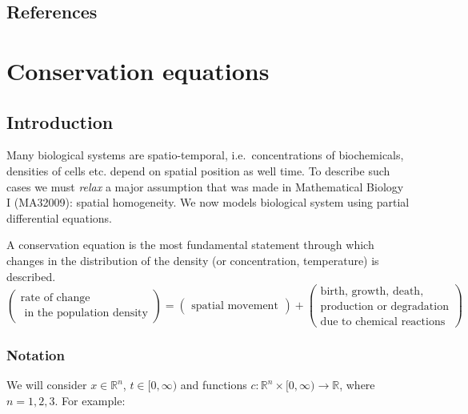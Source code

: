 \documentclass[
  letterpaper,
  DIV=11,
  numbers=noendperiod]{scrreprt}
\theoremstyle{plain}
\theoremstyle{definition}
\theoremstyle{plain}
\theoremstyle{remark}
\begin{document}
\hypertarget{references}{%
\section*{References}\label{references}}



\hypertarget{conservation-equations}{%
\chapter{Conservation equations}\label{conservation-equations}}

\hypertarget{sec-conservation}{%
\section{Introduction}\label{sec-conservation}}

Many biological systems are spatio-temporal, i.e.~concentrations of
biochemicals, densities of cells etc. depend on spatial position as well
time. To describe such cases we must \emph{relax} a major assumption
that was made in Mathematical Biology I (MA32009): spatial homogeneity.
We now models biological system using partial differential equations.

A conservation equation is the most fundamental statement through which
changes in the distribution of the density (or concentration,
temperature) is described. \[
\begin{pmatrix}
\text{rate of change}\\
\text{ in the population density} 
\end{pmatrix}
= \begin{pmatrix}
\text{spatial movement}
\end{pmatrix}
+ 
 \begin{pmatrix}
 \text{birth, growth, death},\\
 \text{production or degradation}\\
  \text{due to chemical reactions} 
\end{pmatrix}
\]

\hypertarget{notation}{%
\subsection{Notation}\label{notation}}

We will consider \(x \in \mathbb R^n\), \(t \in [0, \infty)\) and
functions \(c: \mathbb R^n \times [0, \infty) \to \mathbb R\), where
\(n=1,2,3\). For example:
\end{document}
